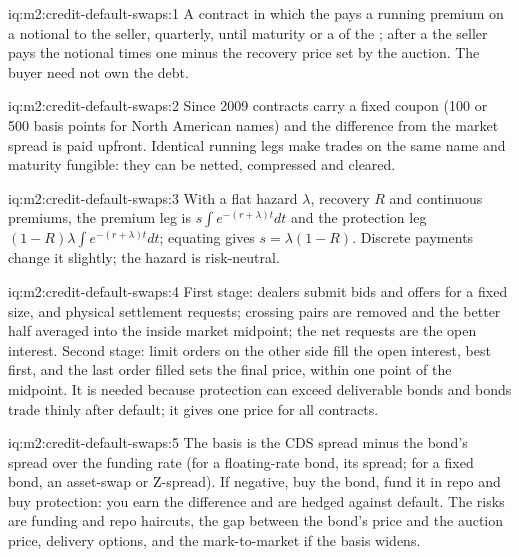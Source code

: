 \begin{solution}{iq:m2:credit-default-swaps:1}
A contract in which the  pays a running premium on a notional to the
seller, quarterly, until maturity or a  of the ; after a
 the seller pays the notional times one minus the recovery price set by
the auction. The buyer need not own the debt.
\end{solution}

\begin{solution}{iq:m2:credit-default-swaps:2}
Since 2009 contracts carry a fixed coupon (100 or 500 basis points for North American
names) and the difference from the market spread is paid upfront. Identical running
legs make trades on the same name and maturity fungible: they can be netted,
compressed and cleared.
\end{solution}

\begin{solution}{iq:m2:credit-default-swaps:3}
With a flat hazard $\lambda$, recovery $R$ and continuous premiums, the premium leg is
$s\int e^{-(r+\lambda)t}dt$ and the protection leg $(1-R)\lambda\int
e^{-(r+\lambda)t}dt$; equating gives $s = \lambda(1-R)$. Discrete payments change it
slightly; the hazard is risk-neutral.
\end{solution}

\begin{solution}{iq:m2:credit-default-swaps:4}
First stage: dealers submit bids and offers for a fixed size, and physical settlement
requests; crossing pairs are removed and the better half averaged into the inside
market midpoint; the net requests are the open interest. Second stage: limit orders
on the other side fill the open interest, best first, and the last order filled sets
the final price, within one point of the midpoint. It is needed because protection can
exceed deliverable bonds and bonds trade thinly after default; it gives one price for
all contracts.
\end{solution}

\begin{solution}{iq:m2:credit-default-swaps:5}
The basis is the CDS spread minus the bond's spread over the funding rate (for a
floating-rate bond, its spread; for a fixed bond, an asset-swap or Z-spread). If
negative, buy the bond, fund it in repo and buy protection: you earn the difference and
are hedged against default. The risks are funding and repo haircuts, the gap between
the bond's price and the auction price, delivery options, and the mark-to-market if
the basis widens.
\end{solution}


